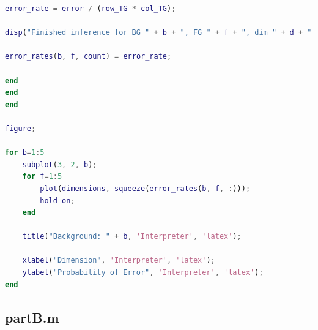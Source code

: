 \documentclass{article}
\begin{document}
\begin{lstlisting}[language=Matlab]
error_rate = error / (row_TG * col_TG);

disp("Finished inference for BG " + b + ", FG " + f + ", dim " + d + ", error rate is " + error_rate);

error_rates(b, f, count) = error_rate;

end
end
end

figure;

for b=1:5
    subplot(3, 2, b);
    for f=1:5
        plot(dimensions, squeeze(error_rates(b, f, :)));
        hold on;
    end

    title("Background: " + b, 'Interpreter', 'latex');
    
    xlabel("Dimension", 'Interpreter', 'latex');
    ylabel("Probability of Error", 'Interpreter', 'latex');
end
\end{lstlisting}

\pagebreak

\subsection*{partB.m}
\end{document}
